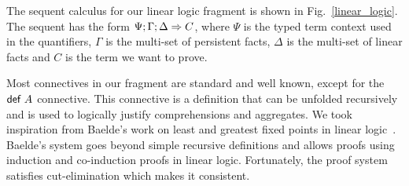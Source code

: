 \begin{table*}
   \begin{center}
\end{center}
\caption{Connectives from Linear Logic used in \lang.}
\label{table:linear}
\end{table*}

The sequent calculus for our linear logic fragment is shown in Fig.~\ref{linear_logic}.
The sequent has the form $\Psi ; \Gamma ; \Delta \Rightarrow C$, where $\Psi$ is the typed
term context used in the quantifiers, $\Gamma$ is the multi-set of persistent facts, $\Delta$
is the multi-set of linear facts and $C$ is the term we want to prove.

Most connectives in our fragment are standard and well known, except for the $\mathsf{def} \; A$ connective. This
connective is a definition that can be unfolded recursively and is used to logically justify
comprehensions and aggregates. We took inspiration from Baelde's work on least and greatest fixed points
in linear logic~\cite{Baelde:2012:LGF:2071368.2071370}. Baelde's system goes beyond simple recursive
definitions and allows proofs using induction and co-induction proofs in linear logic. Fortunately,
the proof system satisfies cut-elimination which makes it consistent. 

